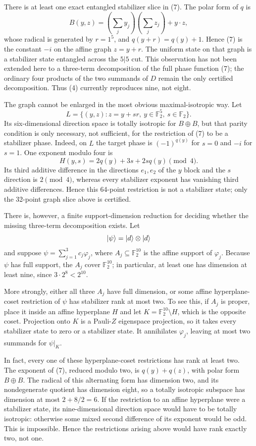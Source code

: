 \documentclass[11pt]{article}
\theoremstyle{definition}
\newcommand{\F}{\mathbb{F}}
\begin{document}
There is at least one exact entangled stabilizer slice in (7). The polar form of $q$ is
\[
B(y,z)=\left(\sum_jy_j\right)\left(\sum_jz_j\right)+y\mathbin{\cdot} z,
\]
whose radical is generated by $r=1^5$, and $q(y+r)=q(y)+1$. Hence (7) is the constant $-i$ on the affine graph $z=y+r$. The uniform state on that graph is a stabilizer state entangled across the $5|5$ cut. This observation has not been extended here to a three-term decomposition of the full phase function (7); the ordinary four products of the two summands of $D$ remain the only certified decomposition. Thus (4) currently reproduces nine, not eight.

The graph cannot be enlarged in the most obvious maximal-isotropic way. Let
\[
L=\{(y,z):z=y+sr,\ y\in\F_2^5,\ s\in\F_2\}.
\]
Its six-dimensional direction space is totally isotropic for $B\oplus B$, but that parity condition is only necessary, not sufficient, for the restriction of (7) to be a stabilizer phase. Indeed, on $L$ the target phase is $(-1)^{q(y)}$ for $s=0$ and $-i$ for $s=1$. One exponent modulo four is
\[
H(y,s)=2q(y)+3s+2s q(y)\pmod4.
\]
Its third additive difference in the directions $e_1,e_2$ of the $y$ block and the $s$ direction is $2\pmod4$, whereas every stabilizer exponent has vanishing third additive differences. Hence this 64-point restriction is not a stabilizer state; only the 32-point graph slice above is certified.

There is, however, a finite support-dimension reduction for deciding whether the missing three-term decomposition exists. Let
\[
\ket{\psi}=\ket{d}\otimes\ket{d}
\]
and suppose $\psi=\sum_{j=1}^3c_j\varphi_j$, where $A_j\subseteq\F_2^{10}$ is the affine support of $\varphi_j$. Because $\psi$ has full support, the $A_j$ cover $\F_2^{10}$; in particular, at least one has dimension at least nine, since $3\cdot2^8<2^{10}$.

More strongly, either all three $A_j$ have full dimension, or some affine hyperplane-coset restriction of $\psi$ has stabilizer rank at most two. To see this, if $A_j$ is proper, place it inside an affine hyperplane $H$ and let $K=\F_2^{10}\setminus H$, which is the opposite coset. Projection onto $K$ is a Pauli-$Z$ eigenspace projection, so it takes every stabilizer state to zero or a stabilizer state. It annihilates $\varphi_j$, leaving at most two summands for $\psi|_K$.

In fact, every one of these hyperplane-coset restrictions has rank at least two. The exponent of (7), reduced modulo two, is $q(y)+q(z)$, with polar form $B\oplus B$. The radical of this alternating form has dimension two, and its nondegenerate quotient has dimension eight, so a totally isotropic subspace has dimension at most $2+8/2=6$. If the restriction to an affine hyperplane were a stabilizer state, its nine-dimensional direction space would have to be totally isotropic: otherwise some mixed second difference of its exponent would be odd. This is impossible. Hence the restrictions arising above would have rank exactly two, not one.
\end{document}
